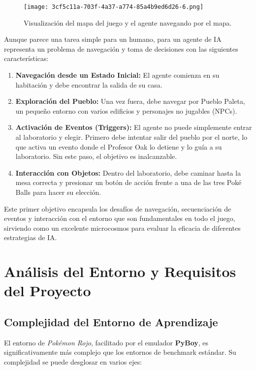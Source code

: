 \documentclass[12pt, oneside, openany]{book}
\begin{document}
\begin{figure}[H]
    \centering
    \texttt{[image: 3cf5c11a-703f-4a37-a774-85a4b9ed6d26-6.png]}
    \caption{Visualización del mapa del juego y el agente navegando por el mapa.}
    \label{fig:poke_map}
\end{figure}

Aunque parece una tarea simple para un humano, para un agente de IA representa un problema de navegación y toma de decisiones con las siguientes características:
\begin{enumerate}
    \item \textbf{Navegación desde un Estado Inicial:} El agente comienza en su habitación y debe encontrar la salida de su casa.
    \item \textbf{Exploración del Pueblo:} Una vez fuera, debe navegar por Pueblo Paleta, un pequeño entorno con varios edificios y personajes no jugables (NPCs).
    \item \textbf{Activación de Eventos (Triggers):} El agente no puede simplemente entrar al laboratorio y elegir. Primero debe intentar salir del pueblo por el norte, lo que activa un evento donde el Profesor Oak lo detiene y lo guía a su laboratorio. Sin este paso, el objetivo es inalcanzable.
    \item \textbf{Interacción con Objetos:} Dentro del laboratorio, debe caminar hasta la mesa correcta y presionar un botón de acción frente a una de las tres Poké Balls para hacer su elección.
\end{enumerate}

Este primer objetivo encapsula los desafíos de navegación, secuenciación de eventos y interacción con el entorno que son fundamentales en todo el juego, sirviendo como un excelente microcosmos para evaluar la eficacia de diferentes estrategias de IA.

\section{Análisis del Entorno y Requisitos del Proyecto}
\label{sec:analisis_entorno}

\subsection{Complejidad del Entorno de Aprendizaje}
El entorno de \textit{Pokémon Rojo}, facilitado por el emulador \textbf{PyBoy}, es significativamente más complejo que los entornos de benchmark estándar. Su complejidad se puede desglosar en varios ejes:
\end{document}
